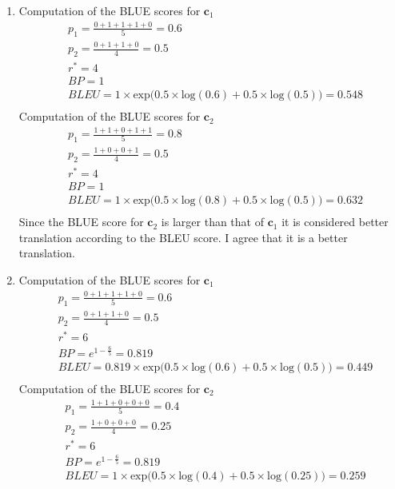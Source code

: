 \documentclass[12pt]{article}
\begin{document}
\begin{enumerate}[label=(\alph*)]
\begin{enumerate}[label=\roman*]
\item
  Computation of the BLUE scores for $\mathbf{c}_1$
  \begin{align*}
    &p_1 = \frac{0 + 1 + 1 + 1 + 0}{5} = 0.6 \\
    &p_2 = \frac{0 + 1 + 1 + 0}{4} = 0.5 \\
    &r^* = 4 \\
    &BP = 1 \\
    &BLEU = 1 \times \text{exp}\big(0.5 \times \text{log}(0.6) + 0.5 \times \text{log}(0.5) \big) = 0.548\\
  \end{align*}
  Computation of the BLUE scores for $\mathbf{c}_2$
  \begin{align*}
    &p_1 = \frac{1 + 1 + 0 + 1 + 1}{5} = 0.8 \\
    &p_2 = \frac{1 + 0 + 0 + 1}{4} = 0.5 \\
    &r^* = 4 \\
    &BP = 1 \\
    &BLEU = 1 \times \text{exp}\big(0.5 \times \text{log}(0.8) + 0.5 \times \text{log}(0.5) \big) = 0.632\\
  \end{align*}
  Since the BLUE score for $\mathbf{c}_2$ is larger than that of $\mathbf{c}_1$ it is considered better translation according to the BLEU score. I agree that it is a better translation.
\item
  Computation of the BLUE scores for $\mathbf{c}_1$
  \begin{align*}
    &p_1 = \frac{0 + 1 + 1 + 1 + 0}{5} = 0.6 \\
    &p_2 = \frac{0 + 1 + 1 + 0}{4} = 0.5 \\
    &r^* = 6 \\
    &BP = e^{1 - \frac{6}{5}} = 0.819 \\
    &BLEU = 0.819 \times \text{exp}\big(0.5 \times \text{log}(0.6) + 0.5 \times \text{log}(0.5) \big) = 0.449 \\
  \end{align*}
  Computation of the BLUE scores for $\mathbf{c}_2$
  \begin{align*}
    &p_1 = \frac{1 + 1 + 0 + 0 + 0}{5} = 0.4 \\
    &p_2 = \frac{1 + 0 + 0 + 0}{4} = 0.25 \\
    &r^* = 6 \\
    &BP = e^{1 - \frac{6}{5}} = 0.819 \\
    &BLEU = 1 \times \text{exp}\big(0.5 \times \text{log}(0.4) + 0.5 \times \text{log}(0.25) \big) = 0.259 \\

\end{align*}
\end{enumerate}
\end{enumerate}
\end{document}
